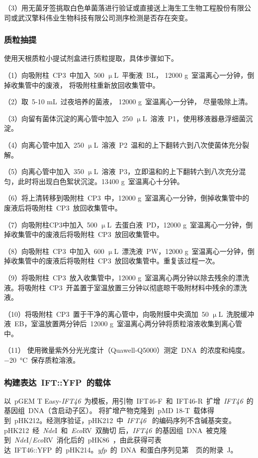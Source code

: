 （3）用无菌牙签挑取白色单菌落进行验证或直接送上海生工生物工程股份有限公司或武汉擎科伟业生物科技有限公司测序检测是否存在突变。

\subsubsection{质粒抽提}
使用天根质粒小提试剂盒进行质粒提取，具体步骤如下。

（1）向吸附柱\ CP3\ 中加入\ 500 $\upmu$L\ 平衡液\ BL， 12000 g\ 室温离心一分钟，倒掉收集管中的废液， 将吸附柱重新放回收集管中。

（2）取\ 5-10 mL\ 过夜培养的菌液， 12000 g\ 室温离心一分钟， 尽量吸除上清。

（3）向留有菌体沉淀的离心管中加入\ 250 $\upmu$L\ 溶液\ P1，使用移液器悬浮细菌沉淀。

（4）向离心管中加入\ 250 $\upmu$L\ 溶液\ P2\ 温和的上下翻转六到八次使菌体充分裂解。

（5）向离心管中加入\ 350 $\upmu$L\ 溶液\ P3，立即温和的上下翻转六到八次充分混匀，此时将出现白色絮状沉淀。13400 g\ 室温离心十分钟。

（6）将上清转移到吸附柱\ CP3\ 中，12000 g\ 室温离心一分钟，倒掉收集管中的废液后将吸附柱\ CP3\ 放回收集管中。

（7）向吸附柱CP3中加入\ 500 $\upmu$L\ 去蛋白液\ PD，12000 g\ 室温离心一分钟，倒掉收集管中的废液后将吸附柱\ CP3\ 放回收集管中。

（8）向吸附柱\ CP3\ 中加入\ 600 $\upmu$L\ 漂洗液\ PW，12000 g\ 室温离心一分钟，倒掉收集管中的废液后将吸附柱\ CP3\ 放回收集管中。重复该过程一次。

（9）将吸附柱\ CP3\ 放入收集管中，12000 g\ 室温离心两分钟以除去残余的漂洗液。将吸附柱\ CP3\ 开盖置于室温放置三分钟以彻底晾干吸附材料中残余的漂洗液。

（10）将吸附柱\ CP3\ 置于干净的离心管中，向吸附膜中央滴加\ 50 $\upmu$L\ 洗脱缓冲液\ EB，室温放置两分钟后\ 12000 g\ 室温离心两分钟将质粒溶液收集到离心管中。

（11） 使用微量紫外分光光度计（Quawell-Q5000）测定\ DNA\ 的浓度和纯度。\SI{-20}{\degreeCelsius}\ 保存质粒溶液。

\subsubsection{构建表达\ IFT::YFP\ 的载体}
以\ pGEM T Easy-\textit{IFT46}\ 为模板，用引物\ IFT46-F\ 和\ IFT46-R\ 扩增\ \textit{IFT46}\ 的基因组\ DNA（含启动子区）。 将扩增产物克隆到\ pMD 18-T\ 载体得到\ pHK212。经测序验证，pHK212\ 中\ \textit{IFT46} \ 的编码序列不含碱基突变。pHK212\ 经\ \textit{Nde}I\ 和\ \textit{Eco}RV\ 双酶切
后，\textit{IFT46}\ 的基因组\ DNA\ 被克隆到\ \textit{Nde}I/\textit{Eco}RV\ 消化后的\ pHK86\ \citep{Diener2009,Long2012}，由此获得可表达\ IFT46::YFP\ 的\ pHK214。\textit{yfp}\ 的\ DNA\ 和蛋白序列见第\ \pageref{appen:J}\ 页的附录\ J。

